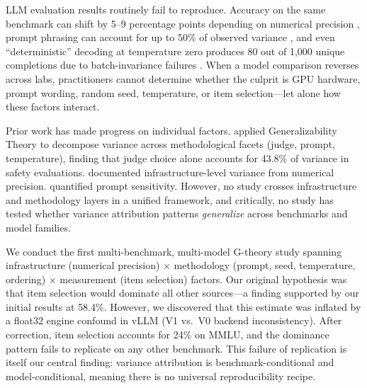 \documentclass[letterpaper]{article}
\begin{document}
LLM evaluation results routinely fail to reproduce.
Accuracy on the same benchmark can shift by 5--9 percentage points depending on numerical precision \citep{yuan2025precision}, prompt phrasing can account for up to 50\% of observed variance \citep{brittlebench2026}, and even ``deterministic'' decoding at temperature zero produces 80 out of 1{,}000 unique completions due to batch-invariance failures \citep{thinkingmachines2025}.
When a model comparison reverses across labs, practitioners cannot determine whether the culprit is GPU hardware, prompt wording, random seed, temperature, or item selection---let alone how these factors interact.

Prior work has made progress on individual factors.
\citet{mesting2026} applied Generalizability Theory to decompose variance across methodological facets (judge, prompt, temperature), finding that judge choice alone accounts for 43.8\% of variance in safety evaluations.
\citet{yuan2025precision} documented infrastructure-level variance from numerical precision.
\citet{brittlebench2026} quantified prompt sensitivity.
However, no study crosses infrastructure and methodology layers in a unified framework, and critically, no study has tested whether variance attribution patterns \emph{generalize} across benchmarks and model families.

We conduct the first multi-benchmark, multi-model G-theory study spanning infrastructure (numerical precision) $\times$ methodology (prompt, seed, temperature, ordering) $\times$ measurement (item selection) factors.
Our original hypothesis was that item selection would dominate all other sources---a finding supported by our initial results at 58.4\%.
However, we discovered that this estimate was inflated by a float32 engine confound in vLLM (V1 vs.\ V0 backend inconsistency).
After correction, item selection accounts for 24\% on MMLU, and the dominance pattern fails to replicate on any other benchmark.
This failure of replication is itself our central finding: variance attribution is benchmark-conditional and model-conditional, meaning there is no universal reproducibility recipe.
\end{document}

